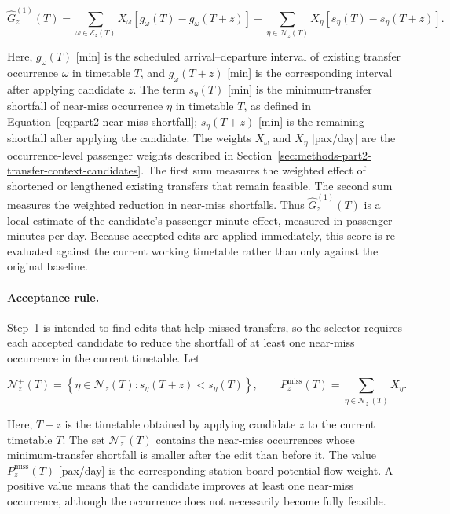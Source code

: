 \documentclass[preprint,12pt]{elsarticle}
\begin{document}
\begin{equation}
\widehat G_z^{(1)}(T)
=
\sum_{\omega\in\mathcal{E}_z(T)}
X_\omega
\left[
g_\omega(T)-g_\omega(T+z)
\right]
+
\sum_{\eta\in\mathcal{N}_z(T)}
X_\eta
\left[
s_\eta(T)-s_\eta(T+z)
\right].
\label{eq:part2-step1-proxy-intro}
\end{equation}

Here, \(g_\omega(T)\) [min] is the scheduled arrival--departure interval of existing transfer occurrence \(\omega\) in timetable \(T\), and \(g_\omega(T+z)\) [min] is the corresponding interval after applying candidate \(z\). The term \(s_\eta(T)\) [min] is the minimum-transfer shortfall of near-miss occurrence \(\eta\) in timetable \(T\), as defined in Equation~\eqref{eq:part2-near-miss-shortfall}; \(s_\eta(T+z)\) [min] is the remaining shortfall after applying the candidate. The weights \(X_\omega\) and \(X_\eta\) [pax/day] are the occurrence-level passenger weights described in Section~\ref{sec:methods-part2-transfer-context-candidates}. The first sum measures the weighted effect of shortened or lengthened existing transfers that remain feasible. The second sum measures the weighted reduction in near-miss shortfalls. Thus \(\widehat G_z^{(1)}(T)\) is a local estimate of the candidate's passenger-minute effect, measured in passenger-minutes per day. Because accepted edits are applied immediately, this score is re-evaluated against the current working timetable rather than only against the original baseline.
\paragraph*{Acceptance rule.}
Step~1 is intended to find edits that help missed transfers, so the selector requires each accepted candidate to reduce the shortfall of at least one near-miss occurrence in the current timetable. Let

\begin{equation}
\mathcal{N}^{+}_z(T)
=
\left\{
\eta\in\mathcal{N}_z(T):
s_\eta(T+z)<s_\eta(T)
\right\},
\qquad
P^{\mathrm{miss}}_z(T)
=
\sum_{\eta\in\mathcal{N}^{+}_z(T)}X_\eta .
\label{eq:part2-step1-near-miss-flow}
\end{equation}

Here, \(T+z\) is the timetable obtained by applying candidate \(z\) to the current timetable \(T\). The set \(\mathcal{N}^{+}_z(T)\) contains the near-miss occurrences whose minimum-transfer shortfall is smaller after the edit than before it. The value \(P^{\mathrm{miss}}_z(T)\) [pax/day] is the corresponding station-board potential-flow weight. A positive value means that the candidate improves at least one near-miss occurrence, although the occurrence does not necessarily become fully feasible.
\end{document}
